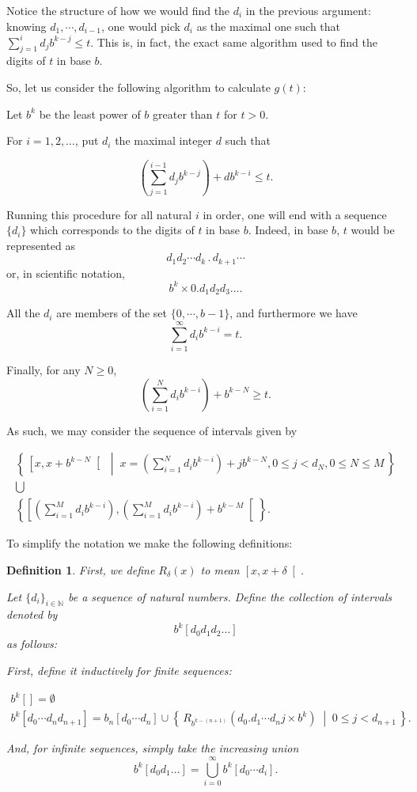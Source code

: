 \documentclass[11pt, reqno]{amsart}
\newcommand{\N}{\mathbb{N}}
\newtheorem{definition}{Definition}
\begin{document}
\bigskip

Notice the structure of how we would find the $d_i$ in the previous argument: knowing $d_1, \cdots, d_{i-1}$, one would pick $d_i$ as the maximal one such that $\sum_{j = 1}^i d_j b^{k-j} \leq t$. This is, in fact, the exact same algorithm used to find the digits of $t$ in base $b$.

So, let us consider the following algorithm to calculate $g(t)$:

Let $b^k$ be the least power of $b$ greater than $t$ for $t > 0$.

For $i = 1, 2, \dots$, put $d_i$ the maximal integer $d$ such that

\[ \left( \sum_{j = 1}^{i-1} d_j b^{k-j} \right) + d b^{k-i} \leq t.\]
\label{digalg}

Running this procedure for all natural $i$ in order, one will end with a sequence $\{d_i\}$ which corresponds to the digits of $t$ in base $b$. Indeed, in base $b$, $t$ would be represented as
\[d_1 d_2 \cdots d_k \, . \, d_{k+1} \cdots\]
or, in scientific notation,
\[b^k \times 0.d_1 d_2 d_3 \dots .\]

All the $d_i$ are members of the set $\{ 0, \cdots, b-1\}$, and furthermore we have
\[\sum_{i = 1}^\infty d_i b^{k-i} = t.\]

Finally, for any $N \geq 0$,
\[(\sum_{i=1}^N d_i b^{k-i}) + b^{k-N} \geq t.\]

As such, we may consider the sequence of intervals given by

\begin{gather*}
\left\{\, \left[ x , x + b^{k-N} \right[ \;\middle|\; x = \left(\sum_{i=1}^N d_i b^{k-i}\right) + j b^{k-N}, 0 \leq j < d_N, 0 \leq N \leq M\,\right\}\\
\bigcup\\
\left\{\left[ \left(\sum_{i=1}^M d_i b^{k-i}\right) ,\left(\sum_{i=1}^M d_i b^{k-i}\right) + b^{k-M} \right[\right\}.
\end{gather*}

To simplify the notation we make the following definitions:

\begin{definition}
First, we define $R_\delta(x)$ to mean $\left[x, x+\delta \right[$.

Let $\{d_i\}_{i \in \N}$ be a sequence of natural numbers. Define the collection of intervals denoted by
\[ b^k [d_0 d_1 d_2 \dots] \]
as follows:

First, define it inductively for finite sequences:

\begin{gather*}
b^k [] = \emptyset\\
b^k [d_0 \cdots d_n d_{n+1}] = b_n [d_0 \cdots d_n] \cup \left\{\, R_{b^{k-(n+1)}}(d_0 . d_1 \cdots d_n j \times b^k) \;\middle|\; 0 \leq j < d_{n+1} \,\right\}.
\end{gather*}

And, for infinite sequences, simply take the increasing union
\[ b^k[d_0 d_1 \dots] = \bigcup_{i = 0}^\infty b^k[d_0 \cdots d_i].\]

\end{definition}
\end{document}

